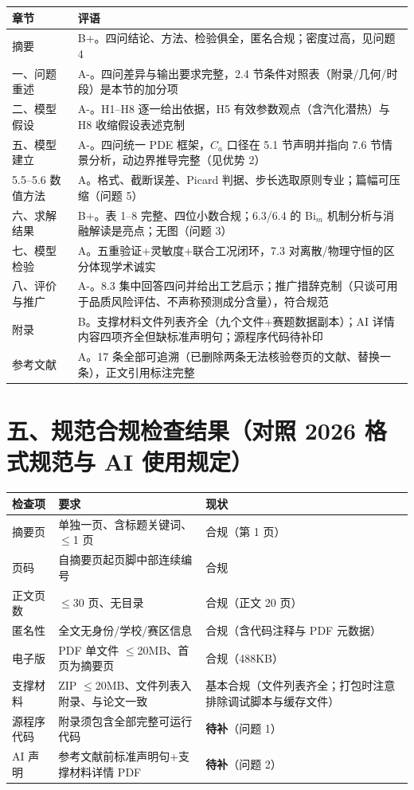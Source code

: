 \documentclass[12pt,a4paper]{ctexart}
\begin{document}
\begin{center}
{\begin{tabular}{lp{11.5cm}}
\toprule
章节 & 评语 \\
\midrule
摘要 & B+。四问结论、方法、检验俱全，匿名合规；密度过高，见问题 4 \\
一、问题重述 & A-。四问差异与输出要求完整，2.4 节条件对照表（附录/几何/时段）是本节的加分项 \\
二、模型假设 & A-。H1--H8 逐一给出依据，H5 有效参数观点（含汽化潜热）与 H8 收缩假设表述克制 \\
五、模型建立 & A-。四问统一 PDE 框架，$C_a$ 口径在 5.1 节声明并指向 7.6 节情景分析，动边界推导完整（见优势 2） \\
5.5--5.6 数值方法 & A。格式、截断误差、Picard 判据、步长选取原则专业；篇幅可压缩（问题 5） \\
六、求解结果 & B+。表 1--8 完整、四位小数合规；6.3/6.4 的 Bi$_m$ 机制分析与消融解读是亮点；无图（问题 3） \\
七、模型检验 & A。五重验证+灵敏度+联合工况闭环，7.3 对离散/物理守恒的区分体现学术诚实 \\
八、评价与推广 & A-。8.3 集中回答四问并给出工艺启示；推广措辞克制（只谈可用于品质风险评估、不声称预测成分含量），符合规范 \\
附录 & B。支撑材料文件列表齐全（九个文件+赛题数据副本）；AI 详情内容四项齐全但缺标准声明句；源程序代码待补印 \\
参考文献 & A。17 条全部可追溯（已删除两条无法核验卷页的文献、替换一条），正文引用标注完整 \\
\bottomrule
\end{tabular}}
\end{center}

\section{五、规范合规检查结果（对照 2026 格式规范与 AI 使用规定）}

\begin{center}
{\begin{tabular}{lp{4.6cm}p{6.2cm}}
\toprule
检查项 & 要求 & 现状 \\
\midrule
摘要页 & 单独一页、含标题关键词、$\le$1 页 & 合规（第 1 页） \\
页码 & 自摘要页起页脚中部连续编号 & 合规 \\
正文页数 & $\le$30 页、无目录 & 合规（正文 20 页） \\
匿名性 & 全文无身份/学校/赛区信息 & 合规（含代码注释与 PDF 元数据） \\
电子版 & PDF 单文件 $\le$20MB、首页为摘要页 & 合规（488KB） \\
支撑材料 & ZIP $\le$20MB、文件列表入附录、与论文一致 & 基本合规（文件列表齐全；打包时注意排除调试脚本与缓存文件） \\
源程序代码 & 附录须包含全部完整可运行代码 & \textbf{待补}（问题 1） \\
AI 声明 & 参考文献前标准声明句+支撑材料详情 PDF & \textbf{待补}（问题 2） \\
\bottomrule
\end{tabular}}
\end{center}
\end{document}
